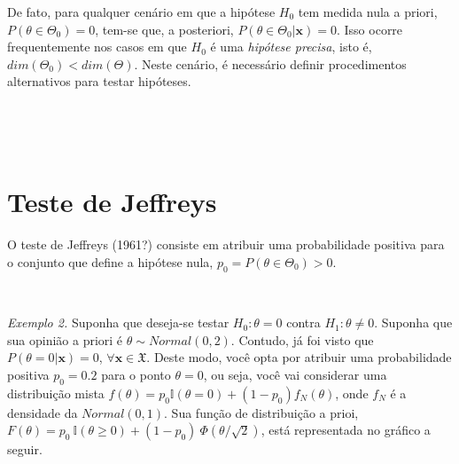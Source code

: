 \documentclass[
]{book}
\begin{document}
De fato, para qualquer cenário em que a hipótese \(H_0\) tem medida nula a priori, \(P(\theta \in \Theta_0)=0\), tem-se que, a posteriori, \(P(\theta \in \Theta_0|\boldsymbol x)=0\). Isso ocorre frequentemente nos casos em que \(H_0\) é uma \emph{hipótese precisa}, isto é, \(dim(\Theta_0)<dim(\Theta)\). Neste cenário, é necessário definir procedimentos alternativos para testar hipóteses.

\(~\)

\(~\)

\hypertarget{teste-de-jeffreys}{%
\section{Teste de Jeffreys}\label{teste-de-jeffreys}}

O teste de Jeffreys (1961?) consiste em atribuir uma probabilidade positiva para o conjunto que define a hipótese nula, \(p_0=P(\theta \in \Theta_0)>0\).

\(~\)

\emph{Exemplo 2.} Suponha que deseja-se testar \(H_0: \theta=0\) contra \(H_1: \theta\neq 0\). Suponha que sua opinião a priori é \(\theta \sim Normal(0,2)\). Contudo, já foi visto que \(P(\theta=0|\boldsymbol x)=0\), \(\forall \boldsymbol x \in \mathfrak{X}\). Deste modo, você opta por atribuir uma probabilidade positiva \(p_0=0.2\) para o ponto \(\theta=0\), ou seja, você vai considerar uma distribuição mista \(f(\theta)=p_0\mathbb{I}(\theta=0)+(1-p_0)f_N(\theta)\), onde \(f_N\) é a densidade da \(Normal(0,1)\). Sua função de distribuição a prioi, \(F(\theta)=p_0~\mathbb{I}(\theta\geq0)+(1-p_0)~\Phi\left(\theta/\sqrt{2}\right)\), está representada no gráfico a seguir.
\end{document}
